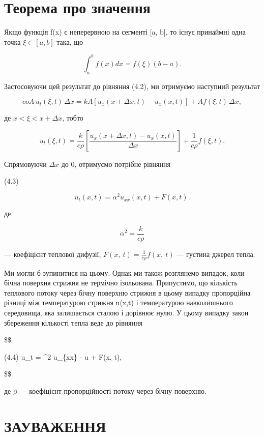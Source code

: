 \documentclass[
  ukrainian,
]{article}
\begin{document}
\section{Теорема про
значення}\label{ux442ux435ux43eux440ux435ux43cux430-ux43fux440ux43e-ux437ux43dux430ux447ux435ux43dux43dux44f}

Якщо функція f(x) є неперервною на сегменті {[}a, b{]}, то існує
принаймні одна точка \(\xi \in [a, b]\) така, що

\[\int_{a}^{b} f(x) dx = f(\xi) (b-a).\]

Застосовуючи цей результат до рівняння (4.2), ми отримуємо наступний
результат

\[
coA\,u_t(\xi, t)\,\Delta x = kA\left[u_x(x + \Delta x, t) - u_x(x, t)\right] + Af(\xi, t)\,\Delta x,
\]

де \(x < \xi < x + \Delta x\), тобто

\[
u_t(\xi, t) = \frac{k}{c\rho}\left[\frac{u_x(x + \Delta x, t) - u_x(x, t)}{\Delta x}\right] + \frac{1}{c\rho} f(\xi, t).
\]

Спрямовуючи \(\Delta x\) до 0, отримуємо потрібне рівняння

(4.3)

\[u_t(x, t) = \alpha^2 u_{xx}(x, t) + F(x, t).\]

де

\[\alpha^{2}=\frac{k}{c\rho}\]

--- коефіцієнт теплової дифузії,
\(F\left(x,\ t\right)=\frac{1}{c\rho}f\left(x,\ t\right)\) --- густина
джерел тепла.

Ми могли б зупинитися на цьому. Однак ми також розглянемо випадок, коли
бічна поверхня стрижня не термічно ізольована. Припустимо, що кількість
теплового потоку через бічну поверхню стрижня в цьому випадку
пропорційна різниці між температурою стрижня u(x,t) і температурою
навколишнього середовища, яка залишається сталою і дорівнює нулю. У
цьому випадку закон збереження кількості тепла веде до рівняння

\$\$

(4.4) u\_t = \alpha\^{}2 u\_\{xx\} - \beta u + F(x, t),

\$\$

де \(\beta\) --- коефіцієнт пропорційності потоку через бічну поверхню.

\section{ЗАУВАЖЕННЯ}\label{ux437ux430ux443ux432ux430ux436ux435ux43dux43dux44f-3}
\end{document}
